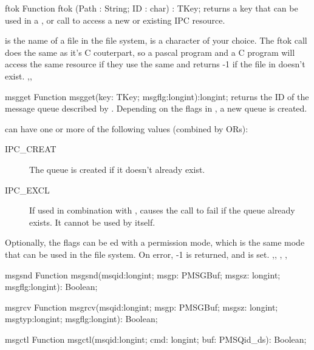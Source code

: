 \begin{function}{ftok}
\Declaration
Function ftok (Path : String; ID : char) : TKey;
\Description
{} returns a key that can be used in a ,
or  call to access a new or existing IPC resource.

 is the name of a file in the file system,  is a
character of your choice. The ftok call does the same as it's C couterpart,
so a pascal program and a C program will access the same resource if
they use the same  and 
\Errors
{} returns -1 if the file in  doesn't exist.
\SeeAlso
{},,
\end{function}

\begin{function}{msgget}
\Declaration
Function msgget(key: TKey; msgflg:longint):longint;	
\Description
{} returns the ID of the message queue described by .
Depending on the flags in , a new queue is created.

 can have one or more of the following values (combined by ORs):
\begin{description}
\item[IPC\_CREAT] The queue is created if it doesn't already exist.
\item[IPC\_EXCL] If used in combination with , causes the
call to fail if the queue already exists. It cannot be used by itself.
\end{description}
Optionally, the flags can be ed with a permission mode, which is the
same mode that can be used in the file system.
\Errors
On error, -1 is returned, and  is set.
\SeeAlso
{},, , , 
\end{function}

\begin{function}{msgsnd}
\Declaration
Function msgsnd(msqid:longint; msgp: PMSGBuf; msgsz: longint; msgflg:longint): Boolean;
\Description
\Errors
\SeeAlso
\end{function}

\begin{function}{msgrcv}
\Declaration
Function msgrcv(msqid:longint; msgp: PMSGBuf; msgsz: longint; msgtyp:longint; msgflg:longint): Boolean;
\Description
\Errors
\SeeAlso
\end{function}

\begin{function}{msgctl}
\Declaration
Function msgctl(msqid:longint; cmd: longint; buf: PMSQid\_ds): Boolean;
\Description
\Errors
\SeeAlso
\end{function}

